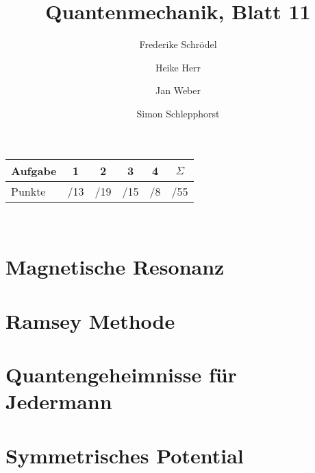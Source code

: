\documentclass[11pt, ngerman, fleqn, DIV=15, headinclude]{scrartcl}
\title{Quantenmechanik, Blatt 11}
\author{
    Frederike Schrödel \and Heike Herr \and Jan Weber \and Simon Schlepphorst
}
\begin{document}
\maketitle
\begin{center}
	\begin{tabular}{l|c|c|c|c|c}
		Aufgabe &1&2&3&4&$\Sigma$\\
		\hline
		Punkte &\quad /13 & \quad /19 & \quad /15 &\quad /8 & \quad /55
	\end{tabular}\\
\end{center}

\section{Magnetische Resonanz}

\section{Ramsey Methode}

\section{Quantengeheimnisse für Jedermann}

\section{Symmetrisches Potential}
\end{document}
